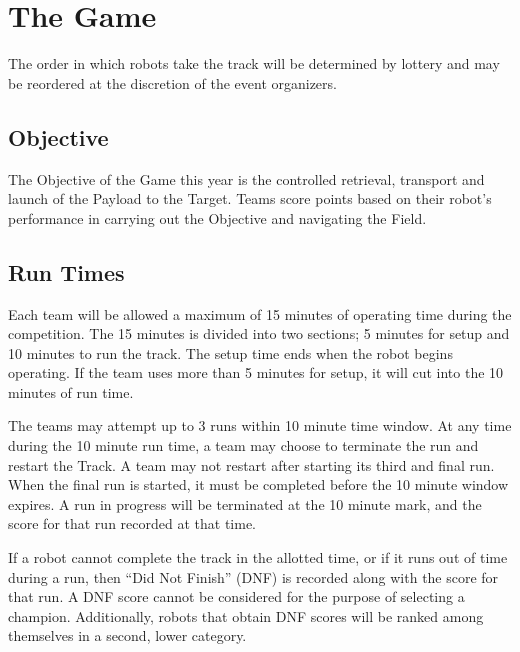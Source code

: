 \section{The Game}
The order in which robots take the track will be determined by lottery and may be reordered at the discretion of the event organizers. 

\subsection{Objective}
The Objective of the Game this year is the controlled retrieval, transport and launch of the Payload to the Target. \iffalse During a run the Payload must be under the control of the robot at all times during its journey to the Launch. \fi Teams score points based on their robot’s performance in carrying out the Objective and navigating the Field.

\subsection{Run Times}
Each team will be allowed a maximum of 15 minutes of operating time during the competition. The 15 minutes is divided into two sections; 5 minutes for setup and 10 minutes to run the track. The setup time ends when the robot begins operating. If the team uses more than 5 minutes for setup, it will cut into the 10 minutes of run time. 

The teams may attempt up to 3 runs within 10 minute time window. At any time during the 10 minute run time, a team may choose to terminate the run and restart the Track. A team may not restart after starting its third and final run. When the final run is started, it must be completed before the 10 minute window expires. A run in progress will be terminated at the 10 minute mark, and the score for that run recorded at that time.

If a robot cannot complete the track in the allotted time, or if it runs out of time during a run, then “Did Not Finish” (DNF) is recorded along with the score for that run. A DNF score cannot be considered for the purpose of selecting a champion. Additionally, robots that obtain DNF scores will be ranked among themselves in a second, lower category.


